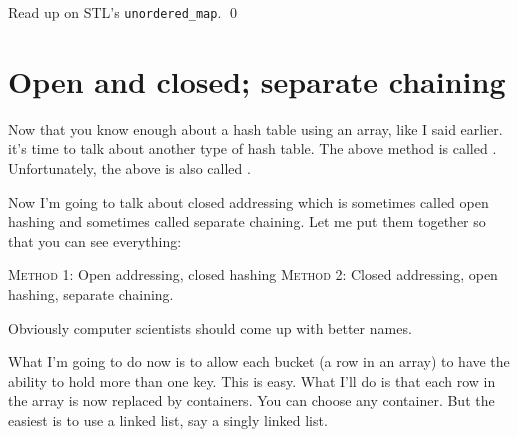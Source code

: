 \begin{ex}
Read up on STL's \verb!unordered_map!.
\qed
\end{ex}




\newpage
\section{Open and closed; separate chaining}

Now that you know enough about a hash table using an array,
like I said earlier. it's time to talk about another type of hash table.
The above method is called .
Unfortunately, the above is also called .

Now I'm going to talk about closed addressing which is sometimes called
open hashing and sometimes called separate chaining.
Let me put them together so that you can see everything:
\begin{tightlist}
\li \textsc{Method 1}: Open addressing, closed hashing
\li \textsc{Method 2}: Closed addressing, open hashing, separate chaining.
\end{tightlist}
Obviously computer scientists should come up with better
names.

What I'm going to do now is to allow each bucket
(a row in an array) to have the ability to hold more than one key.
This is easy.
What I'll do is that each row in the array is now replaced by 
containers.
You can choose any container.
But the easiest is to use a linked list, say a singly linked list.

